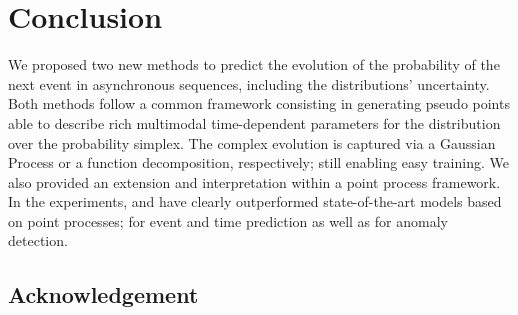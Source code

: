 \section{Conclusion}


We proposed two new methods to predict the evolution of the probability of the next event in asynchronous sequences, including the distributions' uncertainty. Both methods follow a common framework consisting in generating pseudo points able to describe rich multimodal time-dependent parameters for the distribution over the probability simplex. The complex evolution is captured via a Gaussian Process or a function decomposition, respectively; still enabling easy training. We also provided an extension and interpretation within a point process framework. In the experiments, \GPModel and \DirModel have clearly outperformed state-of-the-art models based on point processes; for event and time prediction as well as for anomaly detection.

\subsection*{Acknowledgement}
